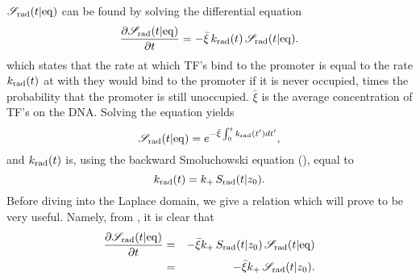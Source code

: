 $\mathscr{S}_{\rm rad}(t|{\rm eq})$ can be found by solving the differential equation
\begin{equation}
 \pdiff{\mathscr{S}_{\rm rad}(t|{\rm eq})}{t} = - \bar{\xi} \, k_{\rm rad}(t) \, \mathscr{S}_{\rm rad}(t|{\rm eq}).
 \elabel{DE_Seq}
\end{equation}
which states that the rate at which TF's bind to the promoter is equal to the rate $k_{{\rm rad}}(t)$ at with they would bind to the promoter if it is never occupied, times the probability that the promoter is still unoccupied. $\bar{\xi}$ is the average concentration of TF's on the DNA. Solving the equation yields
\begin{equation}
 \mathscr{S}_{\rm rad}(t|{\rm eq}) = e^{-\bar{\xi}\int_0^t k_{{\rm rad}}(t') dt'},
 \elabel{Seq}
\end{equation}
and $k_{{\rm rad}}(t)$ is, using the backward Smoluchowski equation (), equal to 
\begin{equation}
 k_{\rm rad}(t) = k_+ \, S_{\rm rad}(t|z_0).
 \elabel{krad}
\end{equation}
Before diving into the Laplace domain, we give a relation which will prove to be very useful. Namely, from , it is clear that
\begin{eqnarray}
 \pdiff{\mathscr{S}_{\rm rad}(t|{\rm eq})}{t} & = & -\bar{\xi} k_+ \, S_{\rm rad}(t|z_0) \, \mathscr{S}_{\rm rad}(t|{\rm eq}) \\
 & = & -\bar{\xi} k_+ \, \mathscr{S}_{\rm rad}(t|z_0).
 \elabel{SeqSsi}
\end{eqnarray}

